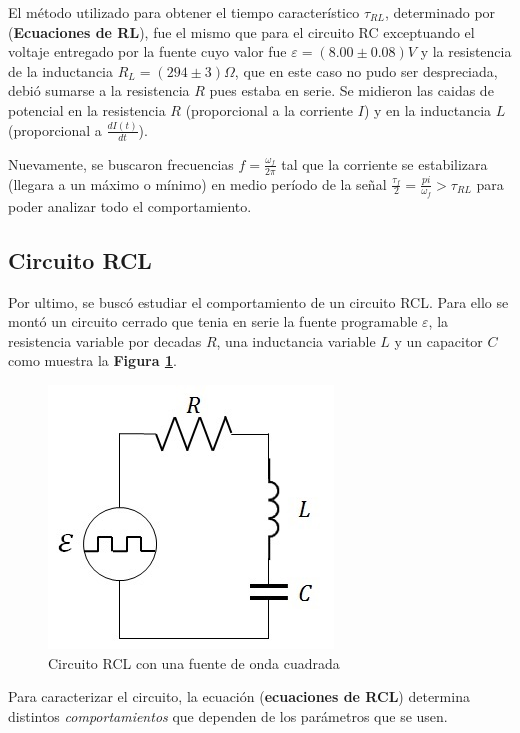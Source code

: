 \documentclass[11pt,a4paper]{article}
\begin{document}
El método utilizado para obtener el tiempo característico $\tau_{RL}$, determinado por (\textbf{Ecuaciones de RL}), fue el mismo que para el circuito RC exceptuando el voltaje entregado por la fuente cuyo valor fue $\varepsilon = (8.00 \pm 0.08)V$ y la resistencia de la inductancia $R_L = (294 \pm 3) \Omega$, que en este caso no pudo ser despreciada, debió sumarse a la resistencia $R$ pues estaba en serie. Se midieron las caidas de potencial en la resistencia $R$ (proporcional a la corriente $I$) y en la inductancia $L$ (proporcional a $\frac{dI(t)}{dt}$).

Nuevamente, se buscaron frecuencias $f = \frac{\omega_f}{2\pi}$ tal que la corriente se estabilizara (llegara a un máximo o mínimo) en medio período de la señal $\frac{\tau_f}{2} = \frac{pi}{\omega_f} > \tau_{RL}$ para poder analizar todo el comportamiento.

\subsection{Circuito RCL}

Por ultimo, se buscó estudiar el comportamiento de un circuito RCL. Para ello se montó un circuito cerrado que tenia en serie la fuente programable $\varepsilon$, la resistencia variable por decadas $R$, una inductancia variable $L$ y un capacitor $C$ como muestra la \textbf{Figura \ref{fig:RCL}}.  

\begin{figure}[h]
\centering
\includegraphics[scale=0.7]{Circuito-RCL}
  \caption{Circuito RCL con una fuente de onda cuadrada}
  \label{fig:RCL}
\end{figure}

Para caracterizar el circuito, la ecuación (\textbf{ecuaciones de RCL}) determina distintos \textit{comportamientos} que dependen de los parámetros que se usen.
\end{document}
